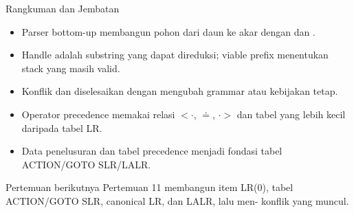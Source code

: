 \documentclass[aspectratio=169,10pt,t]{beamer}
\begin{document}
\begin{frame}{Rangkuman dan Jembatan}
  \begin{itemize}
    \item Parser bottom-up membangun pohon dari daun ke akar dengan
           dan .
    \item Handle adalah substring yang dapat direduksi; viable prefix
          menentukan stack yang masih valid.
    \item Konflik  dan 
          diselesaikan dengan mengubah grammar atau kebijakan tetap.
    \item Operator precedence memakai relasi \(<\cdot\), \(\doteq\),
          \(\cdot>\) dan tabel yang lebih kecil daripada tabel LR.
    \item Data penelusuran dan tabel precedence menjadi fondasi tabel
          ACTION/GOTO SLR/LALR.
  \end{itemize}

  \vspace{4pt}
  \begin{exampleblock}{Pertemuan berikutnya}
    Pertemuan 11 membangun item LR(0), tabel ACTION/GOTO SLR, canonical
    LR, dan LALR, lalu men- konflik yang muncul.
  \end{exampleblock}
\end{frame}
\end{document}
